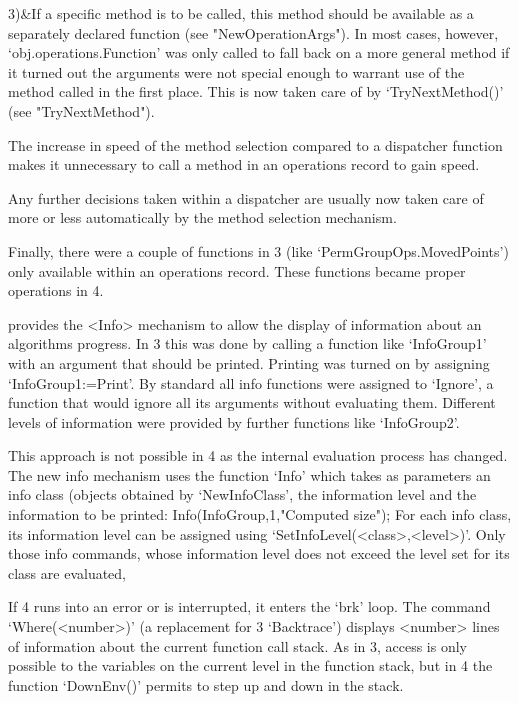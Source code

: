 3)&If a specific method is to be called, this method should be available as a
separately declared function (see "NewOperationArgs"). In most cases, however,
`obj.operations.Function' was only called to fall back on a more general
method if it turned out the arguments were not special enough to warrant use
of the method called in the first place. This is now taken care of by
`TryNextMethod()' (see "TryNextMethod").

\enditems

The increase in speed of the method selection compared to a dispatcher
function makes it unnecessary to call a method in an operations record
to gain speed.

Any further decisions taken within a dispatcher are usually now taken care of
more or less automatically by the method selection mechanism.

Finally, there were a couple of functions in {\GAP}3 (like
`PermGroupOps.MovedPoints') only available within an operations record.
These functions became proper operations in {\GAP}4.


{\GAP} provides the <Info> mechanism to allow the display of information
about an algorithms progress. In {\GAP}3 this was done by calling a function
like `InfoGroup1' with an argument that should be printed. 
Printing was turned on by assigning `InfoGroup1:=Print'. By standard all
info functions were assigned to `Ignore', a function that would ignore all
its arguments without evaluating them. Different levels of information were
provided by further functions like `InfoGroup2'.

This approach is not possible in {\GAP}4 as the internal evaluation process
has changed. The new info mechanism uses the function `Info' which takes as
parameters an info class (objects obtained by `NewInfoClass', the information
level and the information to be printed:
\begintt
Info(InfoGroup,1,"Computed size");
\endtt
For each info class, its information level can be assigned using
`SetInfoLevel(<class>,<level>)'. Only those info commands,
whose information level does not exceed the level set for its class
are evaluated,


If {\GAP}4 runs into an error or is interrupted, it enters the `brk' loop.
The command `Where(<number>)' (a replacement for {\GAP}3 `Backtrace')
displays <number> lines of information about the current function call stack.
As in {\GAP}3, access is only possible to the variables on the current level
in the function stack, but in {\GAP}4 the function `DownEnv()' permits to
step up and down in the stack.

